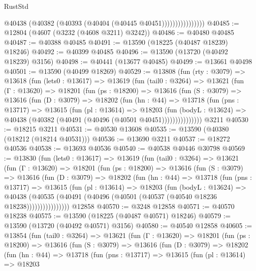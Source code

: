 \begin{lexlean}{RustStd}
\begin{coremodule}
                          @40438 (@40382 (@40393 (@40404 (@40445 @40451))))))))))))))))
@40485 := @12804 (@4607 (@3232 (@4608 @3211) @3242))
@40486 := @40480 @40485
@40487 := @40388 @40485
@40491 := @13590 (@18225 (@40487 @18239) @18246)
@40492 := @40399 @40485
@40496 := @13590 (@13720 (@40492 @18239) @3156)
@40498 := @40441 (@13677 @40485)
@40499 := @13661 @40498
@40501 := @13590 (@40499 @18269)
@40529 := @13808
    (fun (rty : @3079) =>
    @13618
      (fun (lets0 : @13617) =>
      @13619
        (fun (tail0 : @3264) =>
        @13621
          (fun (Γ : @13620) =>
          @18201
            (fun (ps : @18200) =>
            @13616
              (fun (S : @3079) =>
              @13616
                (fun (D : @3079) =>
                @18202
                  (fun (hn : @44) =>
                  @13718
                    (fun (pns : @13717) =>
                    @13615
                      (fun (pl : @13614) =>
                      @18203
                        (fun (bodyL : @13624) =>
                        @40438 (@40382 (@40491 (@40496 (@40501 @40451)))))))))))))))
    @3211
@40530 := @18215 @3211
@40531 := @40530 @13608
@40535 := @13590 (@40380 (@18212 (@18214 @40531)))
@40536 := @13690 @3211
@40537 := @18272 @40536
@40538 := @13693 @40536
@40540 := @40538 @40446 @30798
@40569 := @13830
    (fun (lets0 : @13617) =>
    @13619
      (fun (tail0 : @3264) =>
      @13621
        (fun (Γ : @13620) =>
        @18201
          (fun (ps : @18200) =>
          @13616
            (fun (S : @3079) =>
            @13616
              (fun (D : @3079) =>
              @18202
                (fun (hn : @44) =>
                @13718
                  (fun (pns : @13717) =>
                  @13615
                    (fun (pl : @13614) =>
                    @18203
                      (fun (bodyL : @13624) =>
                      @40438
                        (@40535
                          (@40491 (@40496 (@40501 (@40537 (@40540 @18236 @18238))))))))))))))))
    @12858
@40570 := @3248 @12858
@40571 := @40570 @18238
@40575 := @13590 (@18225 (@40487 @40571) @18246)
@40579 := @13590 (@13720 (@40492 @40571) @3156)
@40580 := @40540 @12858
@40605 := @13854
    (fun (tail0 : @3264) =>
    @13621
      (fun (Γ : @13620) =>
      @18201
        (fun (ps : @18200) =>
        @13616
          (fun (S : @3079) =>
          @13616
            (fun (D : @3079) =>
            @18202
              (fun (hn : @44) =>
              @13718
                (fun (pns : @13717) =>
                @13615
                  (fun (pl : @13614) =>
                  @18203

\end{coremodule}
\end{lexlean}
